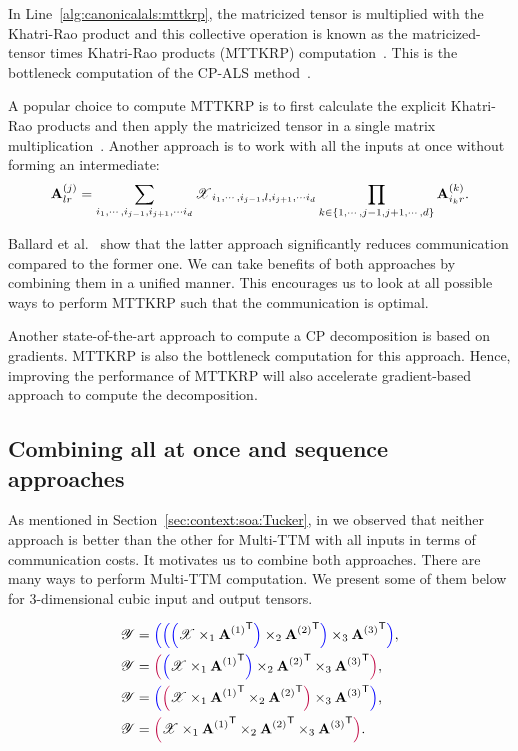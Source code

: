 \documentclass[a4paper,11pt]{article}
\newcommand{\X}{\T{X}}
\newcommand{\Y}{\T{Y}}
\newcommand{\allatoncecolor}{\color{purple}}
\newcommand{\seqcolor}{\color{blue}}
\newcommand{\allatoncestart}{{\allatoncecolor\Big(}}
\newcommand{\allatonceend}{{\allatoncecolor\Big)}}
\newcommand{\seqstart}{{\seqcolor\Big(}}
\newcommand{\seqend}{{\seqcolor\Big)}}
\begin{document}
	In Line~\ref{alg:canonicalals:mttkrp}, the matricized tensor is multiplied with the Khatri-Rao product and this collective operation is known as the matricized-tensor times Khatri-Rao products (MTTKRP) computation~\cite{LCPSV-IPDPS-2017}. This is the bottleneck computation of the CP-ALS method~\cite{BNR-IPDPS-2018,LCPSV-IPDPS-2017}.
	
	A popular choice to compute MTTKRP is to first calculate the explicit Khatri-Rao products and then apply the matricized tensor in a single matrix multiplication~\cite{BK-SIAM-2008}. Another approach is to work with all the inputs at once without forming an intermediate: 
	$$\Mn{A}{j}_{lr} = \sum_{i_1,\cdots,i_{j-1},i_{j+1},\cdots i_d}\X_{i_1,\cdots,i_{j-1},l,i_{j+1},\cdots i_d}\prod_{k\in{\{1,\cdots,j-1,j+1,\cdots,d\}}}\Mn{A}{k}_{i_k r}.$$
	
	Ballard et al.~\cite{BNR-IPDPS-2018} show that the latter approach significantly reduces communication compared to the former one. We can take benefits of both approaches by combining them in a unified manner. This encourages us to look at all possible ways to perform MTTKRP such that the communication is optimal.
	
	
	Another state-of-the-art approach to compute a CP decomposition is based on gradients. MTTKRP is also the bottleneck computation for this approach. Hence, improving the performance of MTTKRP will also accelerate gradient-based approach to compute the decomposition.
	
	
	\subsection{Combining all at once and sequence approaches}
	\label{sec:combinedapproach}
	
	As mentioned in Section~\ref{sec:context:soa:Tucker}, in \cite{ABGKR-SIMAX-2024} we observed that neither approach is better than the other for Multi-TTM with all inputs in terms of communication costs. It motivates us to combine both approaches. There are many ways to perform Multi-TTM computation.  We present some of them below for 3-dimensional cubic input and output tensors.	 
	
	\begin{align*}
		\Y&=\seqstart\seqstart\seqstart\X\times_1{\Mn{A}{1}}^\Tra \seqend\times_2{\Mn{A}{2}}^\Tra\seqend\times_3{\Mn{A}{3}}^\Tra\seqend,\\
		\Y&=\allatoncestart\seqstart\X \times_1 {\Mn{A}{1}}^\Tra \seqend \times_2 {\Mn{A}{2}}^\Tra \times_3 {\Mn{A}{3}}^\Tra \allatonceend,\\
		\Y &= \seqstart\allatoncestart\X \times_1 {\Mn{A}{1}}^\Tra \times_2 {\Mn{A}{2}}^\Tra\allatonceend \times_3 {\Mn{A}{3}}^\Tra\seqend,\\
		\Y &= \allatoncestart\X \times_1 {\Mn{A}{1}}^\Tra \times_2 {\Mn{A}{2}}^\Tra \times_3 {\Mn{A}{3}}^\Tra\allatonceend.
	\end{align*}
	
\end{document}
